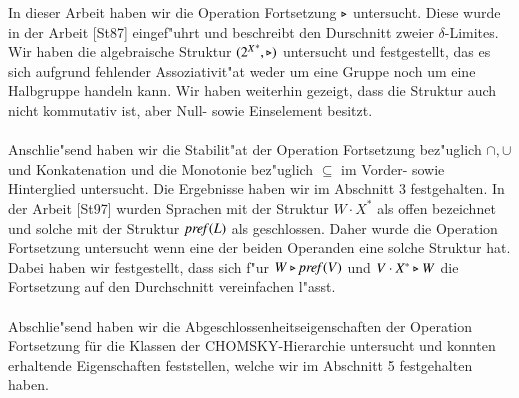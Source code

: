 In dieser Arbeit haben wir die Operation Fortsetzung $\triangleright$ untersucht. Diese wurde in der Arbeit [St87] eingef"uhrt und beschreibt den Durschnitt zweier $\delta$-Limites.
Wir haben die algebraische Struktur $({2^X}^*,\triangleright)$ untersucht und festgestellt, das es sich aufgrund fehlender Assoziativit"at weder um eine Gruppe noch um eine Halbgruppe handeln kann. Wir haben weiterhin gezeigt, dass die Struktur auch nicht kommutativ ist, aber Null- sowie Einselement besitzt. 
\\\\Anschlie"send haben wir die Stabilit"at der Operation Fortsetzung bez"uglich $\cap,\cup$ und Konkatenation und die 
Monotonie bez"uglich $\subseteq$ im Vorder- sowie Hinterglied untersucht. Die Ergebnisse haben wir im Abschnitt 3 festgehalten.
In der Arbeit [St97] wurden Sprachen mit der Struktur $W\cdot X^*$ als offen bezeichnet und solche mit der Struktur $\mathit{pref{(}}L)$ als geschlossen. Daher wurde die Operation Fortsetzung untersucht wenn eine der beiden Operanden eine solche Struktur hat.
Dabei haben wir festgestellt, dass sich f"ur $W\triangleright\mathit{pref{(}}V)$ und $V\cdot X^*\triangleright W$ die Fortsetzung auf den Durchschnitt vereinfachen l"asst.
\\\\Abschlie"send haben wir die Abgeschlossenheitseigenschaften der Operation Fortsetzung für die Klassen der CHOMSKY-Hierarchie untersucht und konnten erhaltende Eigenschaften feststellen, welche wir im Abschnitt 5 festgehalten haben.


